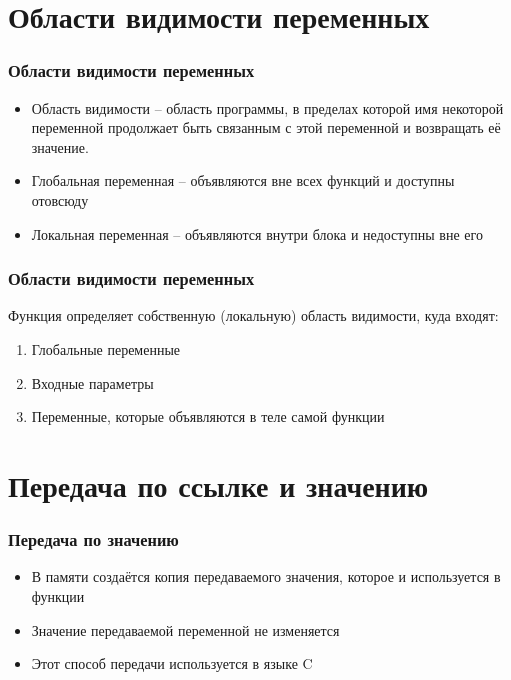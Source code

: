 \documentclass[12pt,pdf,hyperref={unicode}]{beamer}
\begin{document}
\section{Области видимости переменных}

\begin{frame}[fragile]
\frametitle{Области видимости переменных} 
\begin{itemize}
\item Область видимости -- область программы, в пределах которой имя некоторой переменной продолжает быть связанным с этой переменной и возвращать её значение.
\item Глобальная переменная -- объявляются вне всех функций и доступны отовсюду
\item Локальная переменная --  объявляются внутри блока и недоступны вне его
\end{itemize}
\end{frame}

\begin{frame}[fragile]
\frametitle{Области видимости переменных} 
Функция определяет собственную (локальную) область видимости, куда входят:
\begin{enumerate}
\item Глобальные переменные
\item Входные параметры
\item Переменные, которые объявляются в теле самой функции
\end{enumerate}
\end{frame}



\section{Передача по ссылке и значению}

\begin{frame}[fragile]
\frametitle{Передача по значению} 
\begin{itemize}
\item В памяти создаётся копия передаваемого значения, которое и используется в функции
\item Значение передаваемой переменной не изменяется
\item Этот способ передачи используется в языке C
\end{itemize}
\end{frame}
\end{document}
